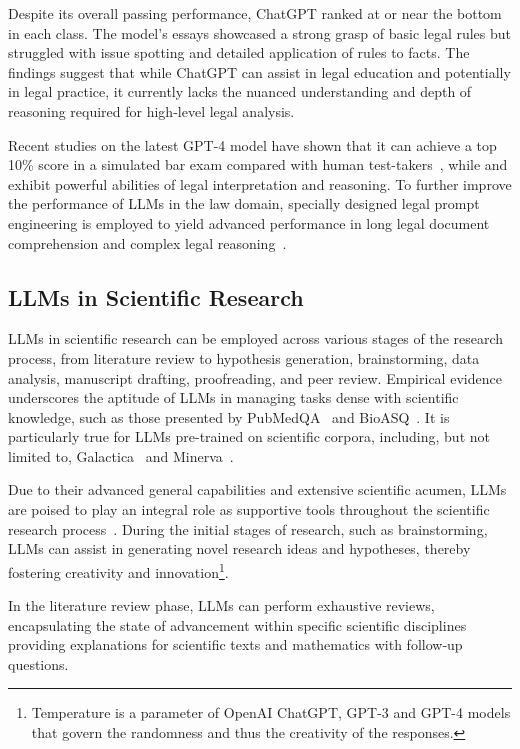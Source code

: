 Despite its overall passing performance, ChatGPT ranked at or near the bottom in each class.
The model's essays showcased a strong grasp of basic legal rules but struggled with issue spotting and detailed application of rules to facts.
The findings suggest that while ChatGPT can assist in legal education and potentially in legal practice, it currently lacks the nuanced understanding and depth of reasoning required for high-level legal analysis.

Recent studies on the latest GPT-4 model have shown that it can achieve a top 10\% score in a simulated bar exam compared with human test-takers~\cite{openai2024gpt4}, while \textcite{nay2022lawinformscode} and exhibit powerful abilities of legal interpretation and reasoning.
To further improve the performance of LLMs in the law domain, specially designed legal prompt engineering is employed to yield advanced performance in long legal document comprehension and complex legal reasoning~\cite{survey}.


\subsection{LLMs in Scientific Research}
\label{subsec:llms-in-scientific-research}

LLMs in scientific research can be employed across various stages of the research process, from literature review to hypothesis generation, brainstorming, data analysis, manuscript drafting, proofreading, and peer review.
Empirical evidence underscores the aptitude of LLMs in managing tasks dense with scientific knowledge, such as those presented by PubMedQA~\cite{jin2019pubmedqa} and BioASQ~\cite{krithara2022bioasq}.
It is particularly true for LLMs pre-trained on scientific corpora, including, but not limited to, Galactica~\cite{taylor2022galactica} and Minerva~\cite{lewkowycz2022minerva}.

Due to their advanced general capabilities and extensive scientific acumen, LLMs are poised to play an integral role as supportive tools throughout the scientific research process~\cite{zhang2023smallstep}.
During the initial stages of research, such as brainstorming, LLMs can assist in generating novel research ideas and hypotheses, thereby fostering creativity and innovation\footnote{Temperature is a parameter of OpenAI ChatGPT, GPT-3 and GPT-4 models that govern the randomness and thus the creativity of the responses.}.

In the literature review phase, LLMs can perform exhaustive reviews, encapsulating the state of advancement within specific scientific disciplines~\cite{haman2023usingchatgpt, aydin2022openaichatgpt} providing explanations for scientific texts and mathematics with follow-up questions.

